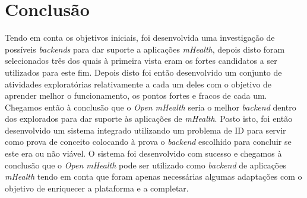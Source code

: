 \chapter{Conclusão}


Tendo em conta os objetivos iniciais, foi desenvolvida uma investigação de possíveis \textit{backends} para dar suporte a aplicações \textit{mHealth}, depois disto foram selecionados três dos quais à primeira vista eram os fortes candidatos a ser utilizados para este fim. Depois disto foi então desenvolvido um conjunto de atividades exploratórias relativamente a cada um deles com o objetivo de aprender melhor o funcionamento, os pontos fortes e fracos de cada um. Chegamos então à conclusão que o \textit{Open mHealth} seria o melhor \textit{backend} dentro dos explorados para dar suporte às aplicações de \textit{mHealth}.
Posto isto, foi então desenvolvido um sistema integrado utilizando um problema de \gls{ID} para servir como prova de conceito colocando à prova o \textit{backend} escolhido para concluir se este era ou não viável.
O sistema foi desenvolvido com sucesso e chegamos à conclusão que o \textit{Open mHealth} pode ser utilizado como \textit{backend} de aplicações \textit{mHealth} tendo em conta que foram apenas necessárias algumas adaptações com o objetivo de enriquecer a plataforma e a completar.


